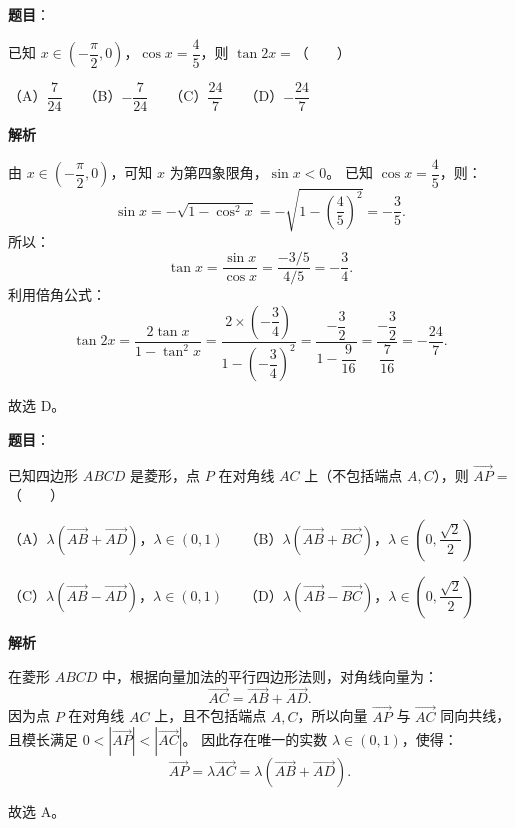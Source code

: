 \begin{answer}

\textbf{题目}：

已知 $x \in \left(-\dfrac{\pi}{2}, 0\right)$，$\cos x = \dfrac{4}{5}$，则 $\tan 2x =$\mbox{（　　）}

（A）$\dfrac{7}{24}$　　（B）$-\dfrac{7}{24}$　　（C）$\dfrac{24}{7}$　　（D）$-\dfrac{24}{7}$

\textbf{解析}

由 $x \in \left(-\dfrac{\pi}{2}, 0\right)$，可知 $x$ 为第四象限角，$\sin x < 0$。
已知 $\cos x = \dfrac{4}{5}$，则：
\nopagebreak[4]
\[\sin x = -\sqrt{1 - \cos^2 x} = -\sqrt{1 - \left(\frac{4}{5}\right)^2} = -\frac{3}{5}.\]
所以：
\nopagebreak[4]
\[\tan x = \frac{\sin x}{\cos x} = \frac{-3/5}{4/5} = -\frac{3}{4}.\]
利用倍角公式：
\nopagebreak[4]
\[\tan 2x = \frac{2\tan x}{1 - \tan^2 x} = \frac{2 \times \left(-\dfrac{3}{4}\right)}{1 - \left(-\dfrac{3}{4}\right)^2} = \frac{-\dfrac{3}{2}}{1 - \dfrac{9}{16}} = \frac{-\dfrac{3}{2}}{\dfrac{7}{16}} = -\frac{24}{7}.\]

故选 D。


\end{answer}
\begin{answer}

\textbf{题目}：

已知四边形 $ABCD$ 是菱形，点 $P$ 在对角线 $AC$ 上（不包括端点 $A, C$），则 $\vec{AP} =$\mbox{（　　）}

（A）$\lambda(\vec{AB} + \vec{AD})$，$\lambda \in (0, 1)$　　（B）$\lambda(\vec{AB} + \vec{BC})$，$\lambda \in \left(0, \dfrac{\sqrt{2}}{2}\right)$

（C）$\lambda(\vec{AB} - \vec{AD})$，$\lambda \in (0, 1)$　　（D）$\lambda(\vec{AB} - \vec{BC})$，$\lambda \in \left(0, \dfrac{\sqrt{2}}{2}\right)$

\textbf{解析}

在菱形 $ABCD$ 中，根据向量加法的平行四边形法则，对角线向量为：
\nopagebreak[4]
\[\vec{AC} = \vec{AB} + \vec{AD}.\]
因为点 $P$ 在对角线 $AC$ 上，且不包括端点 $A, C$，所以向量 $\vec{AP}$ 与 $\vec{AC}$ 同向共线，且模长满足 $0 < |\vec{AP}| < |\vec{AC}|$。
因此存在唯一的实数 $\lambda \in (0, 1)$，使得：
\nopagebreak[4]
\[\vec{AP} = \lambda \vec{AC} = \lambda(\vec{AB} + \vec{AD}).\]

故选 A。


\end{answer}

